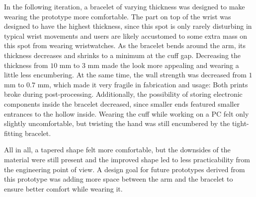 In the following iteration, a bracelet of varying thickness was designed to make wearing the prototype more comfortable. The part on top of the wrist was designed to have the highest thickness, since this spot is only rarely disturbing in typical wrist movements and users are likely accustomed to some extra mass on this spot from wearing wristwatches. As the bracelet bends around the arm, its thickness decreases and shrinks to a minimum at the cuff gap. Decreasing the thickness from $10$ mm to $3$ mm made the look more appealing and wearing a little less encumbering. At the same time, the wall strength was decreased from $1$ mm to $0.7$ mm, which made it very fragile in fabrication and usage: Both prints broke during post-processing. Additionally, the possibility of storing electronic components inside the bracelet decreased, since smaller ends featured smaller entrances to the hollow inside. Wearing the cuff while working on a PC felt only slightly uncomfortable, but twisting the hand was still encumbered by the tight-fitting bracelet. 

All in all, a tapered shape felt more comfortable, but the downsides of the material were still present and the improved shape led to less practicability from the engineering point of view. A design goal for future prototypes derived from this prototype was adding more space between the arm and the bracelet to ensure better comfort while wearing it.

